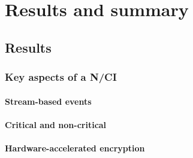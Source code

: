 \chapter{Results and summary}
\graphicspath{{Chapter5/Figs/}{Chapter5/Figs/}}


\section{Results}
\label{chapter5-results}

\subsection{Key aspects of a N/CI}
\label{chapter5-key-aspects}

\subsubsection{Stream-based events}
\label{chapter5-stream-based-events}

\subsubsection{Critical and non-critical}
\label{chapter5-critical-and-non-critical}

\subsubsection{Hardware-accelerated encryption}
\label{chapter5-hardware-accelerated-encryption}

